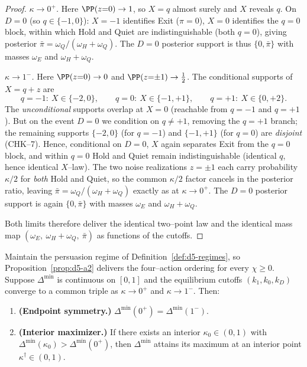 \begin{proof}
\emph{$\kappa\to0^+$.} Here $\PP(z{=}0)\to1$, so $X=q$ almost surely and $X$
reveals $q$. On $D=0$ (so $q\in\{-1,0\}$): $X=-1$ identifies Exit ($\pi=0$),
$X=0$ identifies the $q{=}0$ block, within which Hold and Quiet are
indistinguishable (both $q{=}0$), giving posterior
$\bar\pi=\omega_Q/(\omega_H+\omega_Q)$. The $D=0$ posterior support is thus
$\{0,\bar\pi\}$ with masses $\omega_E$ and $\omega_H+\omega_Q$.

\emph{$\kappa\to1^-$.} Here $\PP(z{=}0)\to0$ and $\PP(z{=}{\pm}1)\to\tfrac12$.
The conditional supports of $X=q+z$ are
\[
  q=-1:\ X\in\{-2,0\},\qquad q=0:\ X\in\{-1,+1\},\qquad q=+1:\ X\in\{0,+2\}.
\]
The \emph{unconditional} supports overlap at $X=0$ (reachable from $q=-1$ and
$q=+1$). But on the event $D=0$ we condition on $q\neq+1$, removing the $q=+1$
branch; the remaining supports $\{-2,0\}$ (for $q=-1$) and $\{-1,+1\}$ (for
$q=0$) are \emph{disjoint} (CHK--7). Hence, conditional on $D=0$, $X$ again
separates Exit from the $q{=}0$ block, and within $q{=}0$ Hold and Quiet remain
indistinguishable (identical $q$, hence identical $X$--law). The two noise
realizations $z=\pm1$ each carry probability $\kappa/2$ for \emph{both} Hold and
Quiet, so the common $\kappa/2$ factor cancels in the posterior ratio, leaving
$\bar\pi=\omega_Q/(\omega_H+\omega_Q)$ exactly as at $\kappa\to0^+$. The $D=0$
posterior support is again $\{0,\bar\pi\}$ with masses $\omega_E$ and
$\omega_H+\omega_Q$.

Both limits therefore deliver the identical two--point law and the identical
mass map $(\omega_E,\ \omega_H+\omega_Q,\ \bar\pi)$ as functions of the cutoffs.
\end{proof}

\begin{proposition}\label{prop:d5-peak}
Maintain the persuasion regime of Definition~\ref{def:d5-regimes}, so
Proposition~\ref{prop:d5-a2} delivers the four--action ordering for every
$\chi\ge0$. Suppose $\Delta^{\min}$ is continuous on $[0,1]$ and the equilibrium
cutoffs $(k_1,k_0,k_D)$ converge to a common triple as $\kappa\to0^+$ and
$\kappa\to1^-$. Then:
\begin{enumerate}
\item[\textnormal{(i)}] \textbf{(Endpoint symmetry.)}
$\Delta^{\min}(0^+)=\Delta^{\min}(1^-)$.
\item[\textnormal{(ii)}] \textbf{(Interior maximizer.)} If there exists an
interior $\kappa_0\in(0,1)$ with $\Delta^{\min}(\kappa_0)>\Delta^{\min}(0^+)$,
then $\Delta^{\min}$ attains its maximum at an interior point
$\kappa^{\dagger}\in(0,1)$.
\end{enumerate}
\end{proposition}

